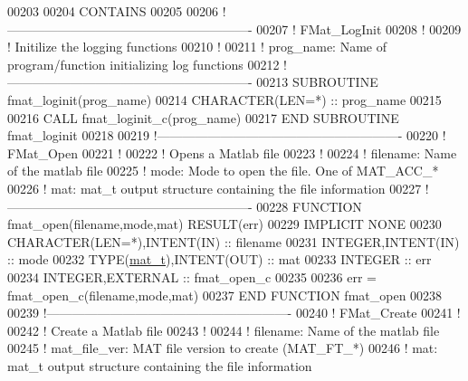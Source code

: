 \begin{DoxyCode}
00203 
00204 \textcolor{keyword}{CONTAINS}
00205 
00206 \textcolor{comment}{!----------------------------------------------------------}
00207 \textcolor{comment}{!   FMat\_LogInit}
00208 \textcolor{comment}{!}
00209 \textcolor{comment}{!   Initilize the logging functions}
00210 \textcolor{comment}{!}
00211 \textcolor{comment}{!   prog\_name: Name of program/function initializing log functions}
00212 \textcolor{comment}{!----------------------------------------------------------}
00213 \textcolor{keyword}{    SUBROUTINE }fmat\_loginit(prog\_name)
00214         \textcolor{keywordtype}{CHARACTER(LEN=*)} :: prog\_name
00215 
00216         \textcolor{keyword}{CALL }fmat\_loginit\_c(prog\_name)
00217 \textcolor{keyword}{    END SUBROUTINE }fmat\_loginit
00218 
00219 \textcolor{comment}{!----------------------------------------------------------}
00220 \textcolor{comment}{!   FMat\_Open}
00221 \textcolor{comment}{!}
00222 \textcolor{comment}{!   Opens a Matlab file}
00223 \textcolor{comment}{!}
00224 \textcolor{comment}{!   filename: Name of the matlab file}
00225 \textcolor{comment}{!   mode:     Mode to open the file. One of MAT\_ACC\_*}
00226 \textcolor{comment}{!   mat:      mat\_t output structure containing the file information}
00227 \textcolor{comment}{!----------------------------------------------------------}
00228 \textcolor{keyword}{    FUNCTION }fmat\_open(filename,mode,mat) \textcolor{keyword}{RESULT}(err)
00229     \textcolor{keywordtype}{IMPLICIT NONE}
00230         \textcolor{keywordtype}{CHARACTER(LEN=*)},\textcolor{keywordtype}{INTENT(IN)}  :: filename
00231         \textcolor{keywordtype}{INTEGER},\textcolor{keywordtype}{INTENT(IN)}           :: mode
00232         \textcolor{keywordtype}{TYPE}(\hyperlink{group___m_a_t_gab0fc888f5a5d79943b16284b1f91c2e8}{mat\_t}),\textcolor{keywordtype}{INTENT(OUT)}      :: mat
00233         \textcolor{keywordtype}{INTEGER}                      :: err
00234         \textcolor{keywordtype}{INTEGER},\textcolor{keywordtype}{EXTERNAL} :: fmat\_open\_c
00235 
00236         err = fmat\_open\_c(filename,mode,mat)
00237 \textcolor{keyword}{    END FUNCTION }fmat\_open
00238 
00239 \textcolor{comment}{!----------------------------------------------------------}
00240 \textcolor{comment}{!   FMat\_Create}
00241 \textcolor{comment}{!}
00242 \textcolor{comment}{!   Create a Matlab file}
00243 \textcolor{comment}{!}
00244 \textcolor{comment}{!   filename:     Name of the matlab file}
00245 \textcolor{comment}{!   mat\_file\_ver: MAT file version to create (MAT\_FT\_*)}
00246 \textcolor{comment}{!   mat:          mat\_t output structure containing the file information}

\end{DoxyCode}
